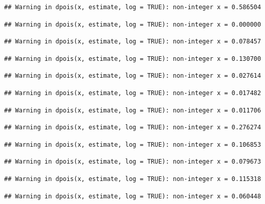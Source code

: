 \documentclass[]{article}
\begin{document}
\begin{verbatim}
## Warning in dpois(x, estimate, log = TRUE): non-integer x = 0.586504
\end{verbatim}

\begin{verbatim}
## Warning in dpois(x, estimate, log = TRUE): non-integer x = 0.000000
\end{verbatim}

\begin{verbatim}
## Warning in dpois(x, estimate, log = TRUE): non-integer x = 0.078457
\end{verbatim}

\begin{verbatim}
## Warning in dpois(x, estimate, log = TRUE): non-integer x = 0.130700
\end{verbatim}

\begin{verbatim}
## Warning in dpois(x, estimate, log = TRUE): non-integer x = 0.027614
\end{verbatim}

\begin{verbatim}
## Warning in dpois(x, estimate, log = TRUE): non-integer x = 0.017482
\end{verbatim}

\begin{verbatim}
## Warning in dpois(x, estimate, log = TRUE): non-integer x = 0.011706
\end{verbatim}

\begin{verbatim}
## Warning in dpois(x, estimate, log = TRUE): non-integer x = 0.276274
\end{verbatim}

\begin{verbatim}
## Warning in dpois(x, estimate, log = TRUE): non-integer x = 0.106853
\end{verbatim}

\begin{verbatim}
## Warning in dpois(x, estimate, log = TRUE): non-integer x = 0.079673
\end{verbatim}

\begin{verbatim}
## Warning in dpois(x, estimate, log = TRUE): non-integer x = 0.115318
\end{verbatim}

\begin{verbatim}
## Warning in dpois(x, estimate, log = TRUE): non-integer x = 0.060448
\end{verbatim}
\end{document}
